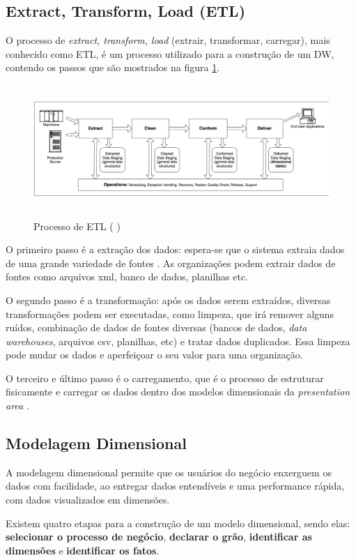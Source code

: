 \subsection{Extract, Transform, Load (ETL)}
O processo de \textit{extract, transform, load} (extrair, transformar, carregar), mais conhecido como ETL, é um processo utilizado para a construção de um DW, contendo os passos que são mostrados na figura \ref{etl}. 
\begin{figure}[H]
\centering
\includegraphics[height=5cm]{imagens/dw_process.png}
\caption{Processo de ETL (\citeauthor{kimball2004} \citeyear{kimball2004})}
\label{etl}
\end{figure}
O primeiro passo é a extração dos dados: espera-se que o sistema extraia dados de uma grande variedade de fontes \citep{kimball2013}. As organizações podem extrair dados de fontes como arquivos xml, banco de dados, planilhas etc.

O segundo passo é a transformação: após os dados serem extraídos, diversas transformações podem ser executadas, como limpeza, que irá remover alguns ruídos, combinação de dados de fontes diversas (bancos de dados, \textit{data warehouses}, arquivos csv, planilhas, etc) e tratar dados duplicados\citep{kimball2013}. Essa limpeza pode mudar os dados e aperfeiçoar o seu valor para uma organização.

O terceiro e último passo é o carregamento, que é o processo de estruturar fisicamente e carregar os dados dentro dos modelos dimensionais da \textit{presentation area} \citep{kimball2013}.

\subsection{Modelagem Dimensional}
A modelagem dimensional permite que os usuários do negócio enxerguem os dados com facilidade, ao entregar dados entendíveis e uma performance rápida, com dados visualizados em dimensões.

Existem quatro etapas para a construção de um modelo dimensional, sendo elas: \textbf{selecionar o processo de negócio}, \textbf{declarar o grão}, \textbf{identificar as dimensões} e \textbf{identificar os fatos}. 

